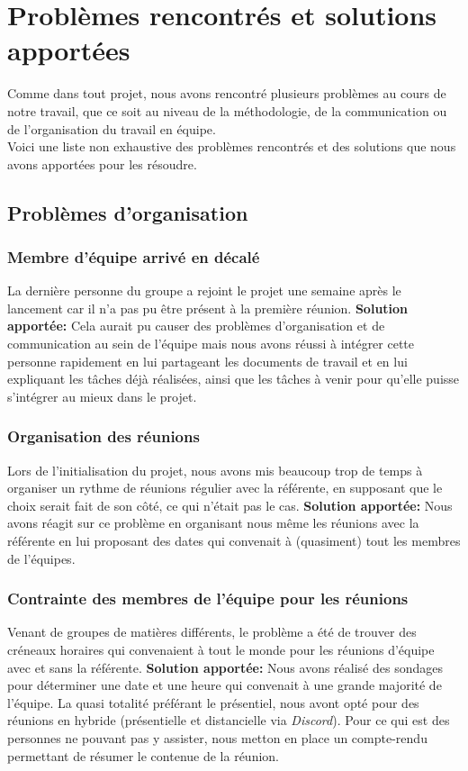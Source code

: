 \documentclass[12pt,a4paper]{article}
\begin{document}
\pagebreak


\section{Problèmes rencontrés et solutions apportées}\label{sec:problems}
Comme dans tout projet, nous avons rencontré plusieurs problèmes au cours de notre travail,
que ce soit au niveau de la méthodologie, de la communication ou de l'organisation du travail en équipe.\\
Voici une liste non exhaustive des problèmes rencontrés et des solutions que nous avons apportées pour les résoudre.
\subsection{Problèmes d'organisation}
\subsubsection{Membre d'équipe arrivé en décalé}
La dernière personne du groupe a rejoint le projet une semaine après 
le lancement car il n'a pas pu être présent à la première réunion. \smallbreak
\hspace{0.5cm}\textbf{Solution apportée:} Cela aurait pu causer des problèmes d'organisation et de communication au sein de l'équipe 
mais nous avons réussi à intégrer cette personne rapidement en lui partageant les documents de travail et en lui expliquant 
les tâches déjà réalisées, ainsi que les tâches à venir pour qu'elle puisse s'intégrer au mieux dans le projet.
\subsubsection{Organisation des réunions}
Lors de l'initialisation du projet, nous avons mis beaucoup trop de temps à organiser un rythme de réunions régulier
avec la référente, en supposant que le choix serait fait de son côté, ce qui n'était pas le cas. \smallbreak
\hspace{0.5cm}\textbf{Solution apportée:} Nous avons réagit sur ce problème en organisant nous même les réunions
avec la référente en lui proposant des dates qui convenait à (quasiment) tout les membres de l'équipes. 
\subsubsection{Contrainte des membres de l'équipe pour les réunions}
Venant de groupes de matières différents, le problème a été de trouver des créneaux horaires qui convenaient 
à tout le monde pour les réunions d'équipe avec et sans la référente. \smallbreak
\hspace{0.5cm}\textbf{Solution apportée:} Nous avons réalisé des sondages pour déterminer une date et une heure qui convenait à une grande majorité de l'équipe.
La quasi totalité préférant le présentiel, nous avont opté pour des réunions en hybride (présentielle et distancielle via \textit{Discord}).
Pour ce qui est des personnes ne pouvant pas y assister, nous metton en place un compte-rendu permettant de résumer le contenue de la réunion.
\end{document}
